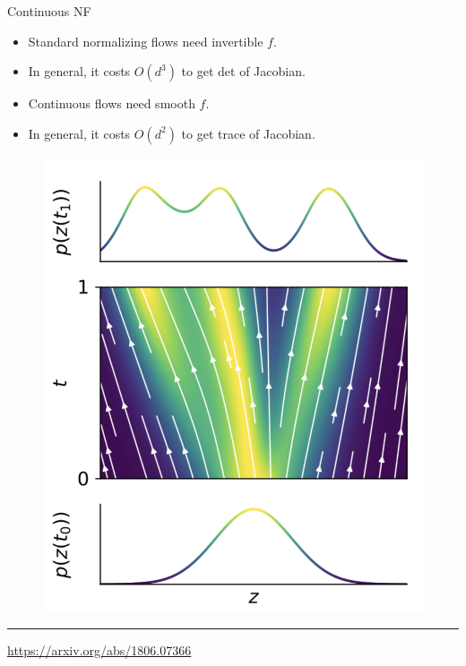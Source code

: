 \documentclass{beamer}
\begin{document}
\begin{frame}{Continuous NF}
	
	\begin{minipage}[t]{0.45\columnwidth}
		\begin{itemize}
			\item Standard normalizing flows need invertible $f$.
			\item In general, it costs $O(d^3)$ to get det of Jacobian.
			\item Continuous flows need smooth $f$.
			\item In general, it costs $O(d^2)$ to get trace of Jacobian.
		\end{itemize}
	\end{minipage}%
	\begin{minipage}[t]{0.55\columnwidth}
		\begin{figure}
			\centering
			\includegraphics[width=\linewidth]{figs/cnf_flow.png}
		\end{figure}
	\end{minipage}
\vfill
\hrule\medskip
{\scriptsize \href{https://arxiv.org/abs/1806.07366}{https://arxiv.org/abs/1806.07366}} 
\end{frame}
\end{document}

